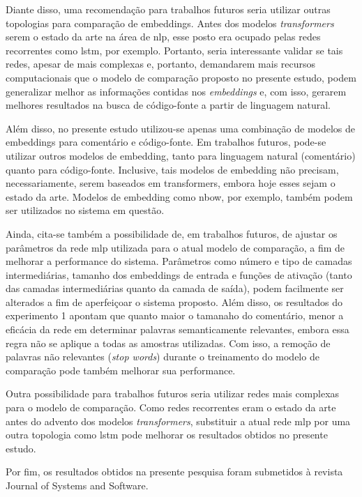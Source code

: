 Diante disso, uma recomendação para trabalhos futuros seria utilizar outras topologias para comparação de embeddings. Antes dos modelos \textit{transformers} serem o estado da arte na área de \gls{nlp}, esse posto era ocupado pelas redes recorrentes como \gls{lstm}, por exemplo. Portanto, seria interessante validar se tais redes, apesar de mais complexas e, portanto, demandarem mais recursos computacionais que o modelo de comparação proposto no presente estudo, podem generalizar melhor as informações contidas nos \textit{embeddings} e, com isso, gerarem melhores resultados na busca de código-fonte a partir de linguagem natural.

Além disso, no presente estudo utilizou-se apenas uma combinação de modelos de embeddings para comentário e código-fonte. Em trabalhos futuros, pode-se utilizar outros modelos de embedding, tanto para linguagem natural (comentário) quanto para código-fonte. Inclusive, tais modelos de embedding não precisam, necessariamente, serem baseados em transformers, embora hoje esses sejam o estado da arte. Modelos de embedding como \gls{nbow}, por exemplo, também podem ser utilizados no sistema em questão.

Ainda, cita-se também a possibilidade de, em trabalhos futuros, de ajustar os parâmetros da rede \gls{mlp} utilizada para o atual modelo de comparação, a fim de melhorar a performance do sistema. Parâmetros como número e tipo de camadas intermediárias, tamanho dos embeddings de entrada e funções de ativação (tanto das camadas intermediárias quanto da camada de saída), podem facilmente ser alterados a fim de aperfeiçoar o sistema proposto. Além disso, os resultados do experimento 1 apontam que quanto maior o tamanaho do comentário, menor a eficácia da rede em determinar palavras semanticamente relevantes, embora essa regra não se aplique a todas as amostras utilizadas. Com isso, a remoção de palavras não relevantes (\textit{stop words}) durante o treinamento do modelo de comparação pode também melhorar sua performance.

Outra possibilidade para trabalhos futuros seria utilizar redes mais complexas para o modelo de comparação. Como redes recorrentes eram o estado da arte antes do advento dos modelos \textit{transformers}, substituir a atual rede \gls{mlp} por uma outra topologia como \gls{lstm} pode melhorar os resultados obtidos no presente estudo.

Por fim, os resultados obtidos na presente pesquisa foram submetidos à revista Journal of Systems and Software.